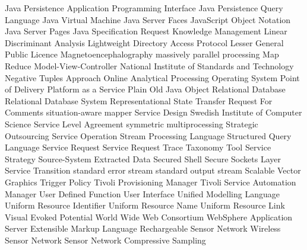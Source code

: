 \begin{acronym}[YTM]
  {Java Persistence Application Programming Interface}
 {Java Persistence Query Language}
  {Java Virtual Machine}
  {Java Server Faces}
 {JavaScript Object Notation}
  {Java Server Pages}
  {Java Specification Request}
   {Knowledge Management}
	{Linear Discriminant Analysis}
 {Lightweight Directory Access Protocol}
 {Lesser General Public Licence}
	{Magnetoencephalography}
	{massively parallel processing}
	{Map Reduce}
  {Model-View-Controller}
 {National Institute of Standards and Technology}
  {Negative Tuples Approach}
 {Online Analytical Processing} 
   {Operating System}
  {Point of Delivery}
 {Platform as a Service}
 {Plain Old Java Object}
  {Relational Database}
 {Relational Database System}
 {Representational State Transfer}
	{Request For Comments}
	{situation-aware mapper}
   {Service Design}
	{Swedish Institute of Computer Science}
  {Service Level Agreement}
	{symmetric multiprocessing}
	{Strategic Outsourcing}
  {Service Operation}
  {Stream Processing Language}
	{Structured Query Language}
   {Service Request}
 {Service Request Trace Taxonomy Tool}
   {Service Strategy}
 {Source-System Extracted Data}
  {Secured Shell}
  {Secure Sockets Layer}
   {Service Transition}
 {standard error stream}
 {standard output stream}
  {Scalable Vector Graphics}
   {Trigger Policy}
  {Tivoli Provisioning Manager}
 {Tivoli Service Automation Manager}
	{User Defined Function}
   {User Interface}
  {Unified Modelling Language}
  {Uniform Resource Identifier}
  {Uniform Resource Name}
  {Uniform Resource Link}
	{Visual Evoked Potential}
  {World Wide Web Consortium}
  {WebSphere Application Server}
  {Extensible Markup Language}
  {Rechargeable Sensor Network}
  {Wireless Sensor Network}
   {Sensor Network}
   {Compressive Sampling}
\end{acronym}